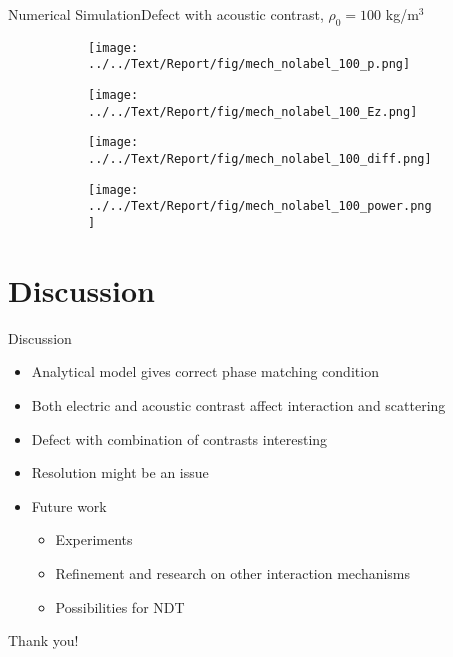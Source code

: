 \documentclass[11pt, final]{beamer}
\begin{document}
	\begin{frame}{Numerical Simulation}{Defect with acoustic contrast, $\rho_0 = 100$ kg/m$^3$}
		\begin{figure}
			\centering
			\begin{subfigure}{0.5\textheight}
				\texttt{[image: ../../Text/Report/fig/mech\_nolabel\_100\_p.png]}
			\end{subfigure}
			\begin{subfigure}{0.5\textheight}
				\texttt{[image: ../../Text/Report/fig/mech\_nolabel\_100\_Ez.png]}
			\end{subfigure}
			\begin{subfigure}{0.5\textheight}
				\texttt{[image: ../../Text/Report/fig/mech\_nolabel\_100\_diff.png]}
			\end{subfigure}
			\begin{subfigure}{0.5\textheight}
				\texttt{[image: ../../Text/Report/fig/mech\_nolabel\_100\_power.png]}
			\end{subfigure}
		\end{figure}
	\end{frame}
	
	\section{Discussion}
	
	\begin{frame}{Discussion}
		\begin{itemize}
			\item Analytical model gives correct phase matching condition
			\pause
			\item Both electric and acoustic contrast affect interaction and scattering
			\pause
			\item Defect with combination of contrasts interesting
			\pause
			\item Resolution might be an issue
			\pause
			\item Future work
			\begin{itemize}
				\item Experiments
				\item Refinement and research on other interaction mechanisms
				\item Possibilities for NDT
			\end{itemize}
		\end{itemize}
	\end{frame}
	
	\begin{frame}
		\centering \huge
		Thank you!
	\end{frame}
\end{document}
